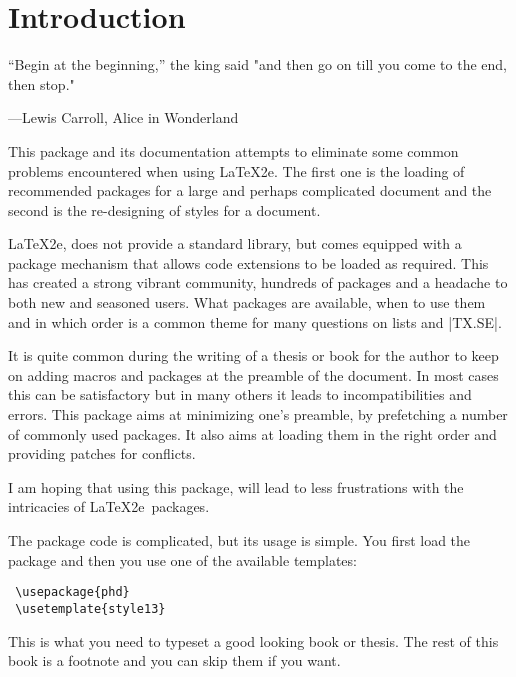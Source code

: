 \makeatletter\@specialfalse\@debugfalse\makeatother
{}
\chapter{Introduction}


\epigraph{``Begin at the beginning,'' the king said
"and then go on till you come to the end, then stop."}{
---Lewis Carroll, Alice in Wonderland}

\large

\noindent This package and its documentation attempts to eliminate some common 
problems encountered when using \LaTeX2e. The first one is the loading of 
recommended packages for a large and perhaps complicated document and 
the second is the re-designing of styles for a document.

 \LaTeX2e, does not provide a standard library, but comes equipped with
 a package mechanism that allows code extensions to be loaded as required.
 This has created a strong vibrant community, hundreds of packages and a 
 headache to both new and seasoned users. What packages are available, when
 to use them and in which order is a common theme for many questions on
 lists and |TX.SE|.

 It is quite common during the writing of a thesis or book
 for the author to keep on adding macros and packages
 at the preamble of the document. In most cases this can
 be satisfactory but in many others it leads to
 incompatibilities and errors. This package aims at
 minimizing one's preamble, by prefetching a number of
 commonly used packages. It also aims at loading them
 in the right order and providing patches for conflicts.
 
 I am hoping that using this package, will lead to less
 frustrations with the intricacies of \LaTeX2e\ packages.

The package code is complicated, but its usage is simple. You first load the package and then
you use one of the available templates:

 \begin{commands}[]{}
 \begin{verbatim}
 \usepackage{phd}
 \usetemplate{style13}
 \end{verbatim}
 \end{commands}

This is what you need to typeset a good looking book or thesis. The rest of this book is a footnote and you can skip them if you want. 

